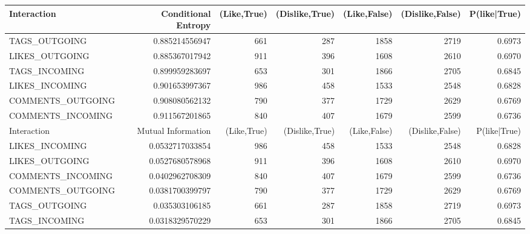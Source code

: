 	
\cleardoublepage
\begin{table}
	\centering
	\begin{tabular}{| >{\small}l | >{\small}r | >{\small}r | >{\small}r | >{\small}r | >{\small}r | >{\small}r |}
		\hline
		Interaction & Conditional Entropy & (Like,True) & (Dislike,True) & (Like,False) & (Dislike,False)  & P(like|True)\\
		\hline
		TAGS\_OUTGOING & 0.885214556947 & 661 & 287 & 1858 & 2719  & 0.6973\\
		LIKES\_OUTGOING & 0.885367017942 & 911 & 396 & 1608 & 2610 & 0.6970\\
		TAGS\_INCOMING & 0.899959283697 & 653 & 301 & 1866 & 2705 & 0.6845\\
		LIKES\_INCOMING & 0.901653997367 & 986 & 458 & 1533 & 2548 & 0.6828\\
		COMMENTS\_OUTGOING & 0.908080562132 & 790 & 377 & 1729 & 2629 & 0.6769\\
		COMMENTS\_INCOMING & 0.911567201865 & 840 & 407 & 1679 & 2599 & 0.6736\\
		\hline
		\hline
		Interaction & Mutual Information & (Like,True) & (Dislike,True) & (Like,False) & (Dislike,False)& P(like|True)\\		
		\hline
		LIKES\_INCOMING & 0.0532717033854 & 986 & 458 & 1533 & 2548 &  0.6828\\
		LIKES\_OUTGOING & 0.0527680578968 & 911 & 396 & 1608 & 2610 & 0.6970\\
		COMMENTS\_INCOMING & 0.0402962708309 & 840 & 407 & 1679 & 2599 & 0.6736\\
		COMMENTS\_OUTGOING & 0.0381700399797 & 790 & 377 & 1729 & 2629 & 0.6769\\
		TAGS\_OUTGOING & 0.035303106185 & 661 & 287 & 1858 & 2719 & 0.6973\\
		TAGS\_INCOMING & 0.0318329570229 & 653 & 301 & 1866 & 2705 & 0.6845\\
		\hline
		

\end{tabular}
\end{table}

